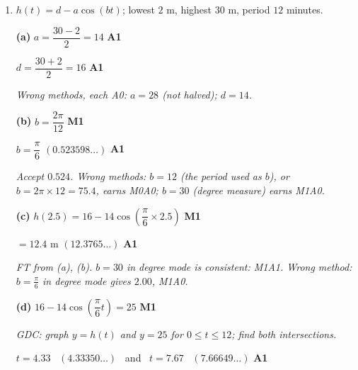 \documentclass[12pt, twoside]{article}
\begin{document}
\begin{enumerate}[itemsep=0.2cm]
\textbf{(c)} $\cos x = -\dfrac{\sqrt{3}}{2}$ \hfill \textbf{M1}

$x = \dfrac{5\pi}{6}$, \ $x = \dfrac{7\pi}{6}$ \hfill \textbf{A1A1}

\emph{Wrong methods: the GDC gives only $\frac{5\pi}{6}$ (2.618), earning
M1A1A0; $x = \frac{\pi}{6}, \frac{11\pi}{6}$ (sign of $\cos x$ wrong) earns
M0A0A0; $\frac{5\pi}{6}$ and $-\frac{5\pi}{6}$ ($-\frac{5\pi}{6}$ outside the
interval) earns M1A1A0. Decimals ($2.62$, $3.67$) earn A1A0 at most: the
question asks for multiples of $\pi$. Extra values outside the interval
earn the final A0.}

\newpage

\item[4.] [Maximum mark: 13]

$h(t) = d - a\cos(bt)$; lowest $2$ m, highest $30$ m, period $12$ minutes.

\textbf{(a)} $a = \dfrac{30 - 2}{2} = 14$ \hfill \textbf{A1}

$d = \dfrac{30 + 2}{2} = 16$ \hfill \textbf{A1}

\emph{Wrong methods, each A0: $a = 28$ (not halved); $d = 14$.}

\textbf{(b)} $b = \dfrac{2\pi}{12}$ \hfill \textbf{M1}

$b = \dfrac{\pi}{6}$ \quad $(0.523598\ldots)$ \hfill \textbf{A1}

\emph{Accept $0.524$. Wrong methods: $b = 12$ (the period used as $b$), or
$b = 2\pi \times 12 = 75.4$, earns M0A0; $b = 30$ (degree measure) earns
M1A0.}

\textbf{(c)} $h(2.5) = 16 - 14\cos\left(\dfrac{\pi}{6} \times 2.5\right)$
\hfill \textbf{M1}

$= 12.4$ m \quad $(12.3765\ldots)$ \hfill \textbf{A1}

\emph{FT from (a), (b). $b = 30$ in degree mode is consistent: M1A1.
Wrong method: $b = \frac{\pi}{6}$ in degree mode gives $2.00$, M1A0.}

\textbf{(d)} $16 - 14\cos\left(\dfrac{\pi}{6}t\right) = 25$ \hfill \textbf{M1}

\textit{GDC: graph $y = h(t)$ and $y = 25$ for $0 \le t \le 12$; find both
intersections.}

$t = 4.33$ \ $(4.33350\ldots)$ \ and \ $t = 7.67$ \ $(7.66649\ldots)$
\hfill \textbf{A1}


\end{enumerate}
\end{document}
